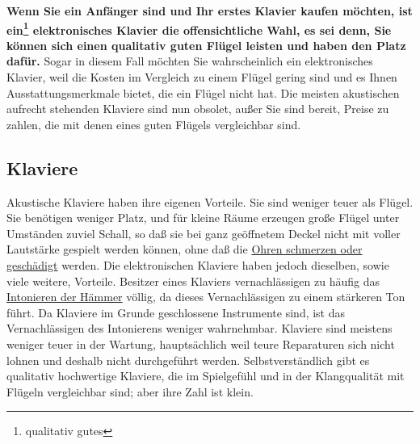 \textbf{Wenn Sie ein Anfänger sind und Ihr erstes Klavier kaufen möchten, ist ein\footnote{qualitativ gutes} elektronisches Klavier die offensichtliche Wahl, es sei denn, Sie können sich einen qualitativ guten Flügel leisten und haben den Platz dafür.}
Sogar in diesem Fall möchten Sie wahrscheinlich ein elektronisches Klavier, weil die Kosten im Vergleich zu einem Flügel gering sind und es Ihnen Ausstattungsmerkmale bietet, die ein Flügel nicht hat.
Die meisten akustischen aufrecht stehenden Klaviere sind nun obsolet, außer Sie sind bereit, Preise zu zahlen, die mit denen eines guten Flügels vergleichbar sind.


\subsection{Klaviere}\hypertarget{c1iii17c}{}

Akustische Klaviere haben ihre eigenen Vorteile.
Sie sind weniger teuer als Flügel.
Sie benötigen weniger Platz, und für kleine Räume erzeugen große Flügel unter Umständen zuviel Schall, so daß sie bei ganz geöffnetem Deckel nicht mit voller Lautstärke gespielt werden können, ohne daß die \hyperlink{c1iii10gehoer}{Ohren schmerzen oder geschädigt} werden.
Die elektronischen Klaviere haben jedoch dieselben, sowie viele weitere, Vorteile.
Besitzer eines Klaviers vernachlässigen zu häufig das \hyperlink{c2_7_hamm}{Intonieren der Hämmer} völlig, da dieses Vernachlässigen zu einem stärkeren Ton führt.
Da Klaviere im Grunde geschlossene Instrumente sind, ist das Vernachlässigen des Intonierens weniger wahrnehmbar.
Klaviere sind meistens weniger teuer in der Wartung, hauptsächlich weil teure Reparaturen sich nicht lohnen und deshalb nicht durchgeführt werden.
Selbstverständlich gibt es qualitativ hochwertige Klaviere, die im Spielgefühl und in der Klangqualität mit Flügeln vergleichbar sind; aber ihre Zahl ist klein.

